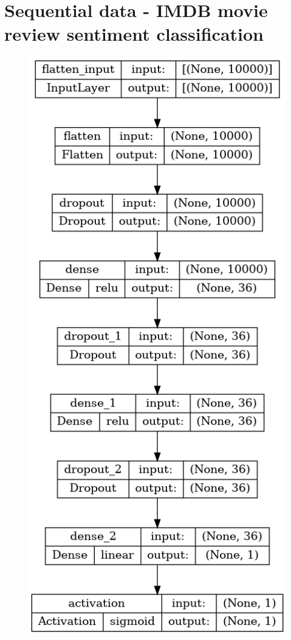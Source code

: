 \section{Sequential data - IMDB movie review sentiment classification}
\begin{figure}[!hb]
    \centering
    \begin{minipage}{0.5\textwidth}
        \centering
        \includegraphics[width=\linewidth]{obrazky-figures/model-plots/Sequential_MLP.png} %

\end{minipage}
\end{figure}
